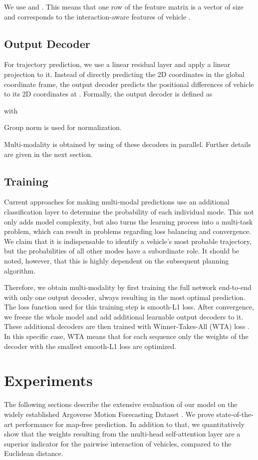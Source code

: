 \documentclass[letterpaper, 10 pt, conference]{ieeeconf}
\begin{document}
We use  and .
This means that one row  of the feature matrix  is a vector of size  and corresponds to the interaction-aware features of vehicle .

\subsection{Output Decoder}
For trajectory prediction, we use a linear residual layer and apply a linear projection to it.
Instead of directly predicting the 2D coordinates in the global coordinate frame, the output decoder predicts the positional differences  of vehicle  to its 2D coordinates at .
Formally, the output decoder is defined as

with

Group norm is used for normalization.

Multi-modality is obtained by using  of these decoders in parallel.
Further details are given in the next section.

\subsection{Training}
Current approaches for making multi-modal predictions use an additional classification layer to determine the probability of each individual mode.
This not only adds model complexity, but also turns the learning process into a multi-task problem, which can result in problems regarding loss balancing and convergence.
We claim that it is indispensable to identify a vehicle's most probable trajectory, but the probabilities of all other modes have a subordinate role.
It should be noted, however, that this is highly dependent on the subsequent planning algorithm.

Therefore, we obtain multi-modality by first training the full network end-to-end with only one output decoder, always resulting in the most optimal prediction.
The loss function used for this training step is smooth-L1 loss.
After convergence, we freeze the whole model and add  additional learnable output decoders to it.
These additional decoders are then trained with Winner-Takes-All (WTA) loss \cite{Guzmanrivera2012}.
In this specific case, WTA means that for each sequence only the weights of the decoder with the smallest smooth-L1 loss are optimized.

\section{Experiments}
The following sections describe the extensive evaluation of our model on the widely established Argoverse Motion Forecasting Dataset \cite{Chang2019}.
We prove state-of-the-art performance for map-free prediction.
In addition to that, we quantitatively show that the weights resulting from the multi-head self-attention layer are a superior indicator for the pairwise interaction of vehicles, compared to the Euclidean distance.
\end{document}
